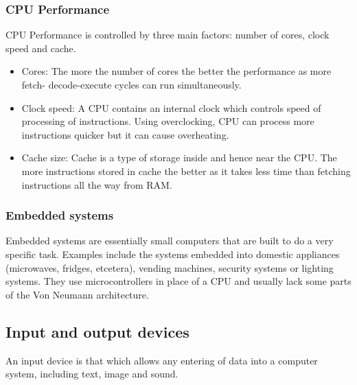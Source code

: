 \documentclass{article}
\begin{document}
\subsubsection{CPU Performance}
CPU Performance is controlled by three main factors: number of cores, clock speed and 
cache.

\begin{itemize}
	\item Cores: The more the number of cores the better the performance as more fetch-
		decode-execute cycles can run simultaneously.
	\item Clock speed: A CPU contains an internal clock which controls speed of 
		processing of instructions. Using overclocking, CPU can process more instructions
		quicker but it can cause overheating.
	\item Cache size: Cache is a type of storage inside and hence near the CPU. 
		The more instructions stored in cache the better as it takes less time than 
		fetching instructions all the way from RAM.
\end{itemize}

\subsubsection{Embedded systems}
Embedded systems are essentially small computers that are built to do a very specific 
task. Examples include the systems embedded into domestic appliances (microwaves, 
fridges, etcetera), vending machines, security systems or lighting systems. They use
microcontrollers in place of a CPU and usually lack some parts of the Von Neumann 
architecture.

\subsection{Input and output devices}
An input device is that which allows any entering of data into a computer system, 
including text, image and sound. 
\end{document}
